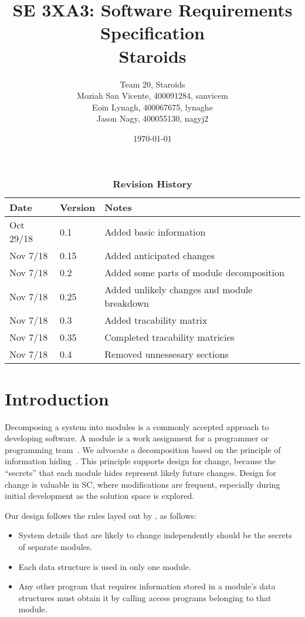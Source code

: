 \documentclass[12pt, titlepage]{article}
\title{SE 3XA3: Software Requirements Specification\\Staroids}
\author{Team 20, Staroids
  \\ Moziah San Vicente, 400091284, sanvicem
  \\ Eoin Lynagh, 400067675, lynaghe
  \\ Jason Nagy, 400055130, nagyj2
}
\date{\today}
\begin{document}
\maketitle

\tableofcontents
\listoftables
\listoffigures

\begin{table}[bp]
\caption{\bf Revision History}
\begin{tabularx}{\textwidth}{p{3cm}p{2cm}X}
\toprule {\bf Date} & {\bf Version} & {\bf Notes}\\
\midrule
Oct 29/18 & 0.1 & Added basic information\\
Nov 7/18 & 0.15 & Added anticipated changes\\
Nov 7/18 & 0.2 & Added some parts of module decomposition\\
Nov 7/18 & 0.25 & Added unlikely changes and module breakdown\\
Nov 7/18 & 0.3 & Added tracability matrix\\
Nov 7/18 & 0.35 & Completed tracability matricies\\
Nov 7/18 & 0.4 & Removed unnessesary sections\\
\bottomrule
\end{tabularx}
\end{table}

\newpage


\section{Introduction}

Decomposing a system into modules is a commonly accepted approach to developing software.  A module is a work assignment for a programmer or programming team~\citep{ParnasEtAl1984}.  We advocate a decomposition based on the principle of information hiding~\citep{Parnas1972a}.  This principle supports design for change, because the ``secrets'' that each module hides represent likely future changes.  Design for change is valuable in SC, where modifications are frequent, especially during initial development as the solution space is explored.

Our design follows the rules layed out by \citet{ParnasEtAl1984}, as follows:
\begin{itemize}
\item System details that are likely to change independently should be the secrets of separate modules.
\item Each data structure is used in only one module.
\item Any other program that requires information stored in a module's data structures must obtain it by calling access programs belonging to that module.
\end{itemize}
\end{document}
